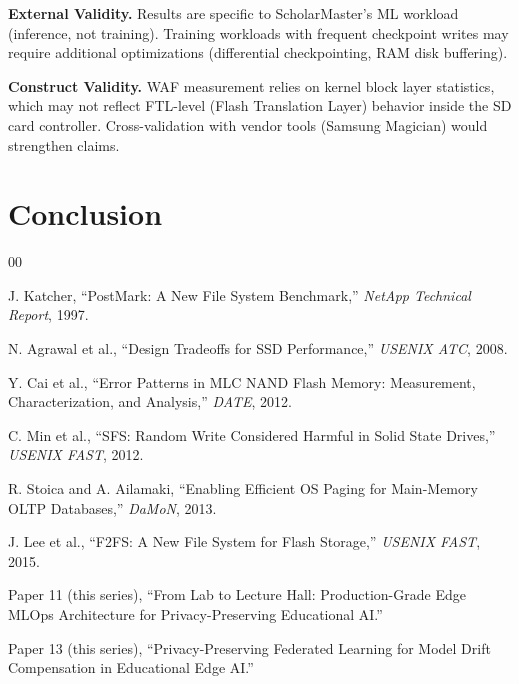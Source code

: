 \documentclass[conference]{IEEEtran}
\begin{document}
\textbf{External Validity.} Results are specific to ScholarMaster's ML workload (inference, not training). Training workloads with frequent checkpoint writes may require additional optimizations (differential checkpointing, RAM disk buffering).

\textbf{Construct Validity.} WAF measurement relies on kernel block layer statistics, which may not reflect FTL-level (Flash Translation Layer) behavior inside the SD card controller. Cross-validation with vendor tools (Samsung Magician) would strengthen claims.

\section{Conclusion}



\begin{thebibliography}{00}

 J. Katcher, ``PostMark: A New File System Benchmark,'' \textit{NetApp Technical Report}, 1997.

 N. Agrawal et al., ``Design Tradeoffs for SSD Performance,'' \textit{USENIX ATC}, 2008.

 Y. Cai et al., ``Error Patterns in MLC NAND Flash Memory: Measurement, Characterization, and Analysis,'' \textit{DATE}, 2012.

 C. Min et al., ``SFS: Random Write Considered Harmful in Solid State Drives,'' \textit{USENIX FAST}, 2012.

 R. Stoica and A. Ailamaki, ``Enabling Efficient OS Paging for Main-Memory OLTP Databases,'' \textit{DaMoN}, 2013.

 J. Lee et al., ``F2FS: A New File System for Flash Storage,'' \textit{USENIX FAST}, 2015.

 Paper 11 (this series), ``From Lab to Lecture Hall: Production-Grade Edge MLOps Architecture for Privacy-Preserving Educational AI.''

 Paper 13 (this series), ``Privacy-Preserving Federated Learning for Model Drift Compensation in Educational Edge AI.''

\end{thebibliography}
\end{document}
